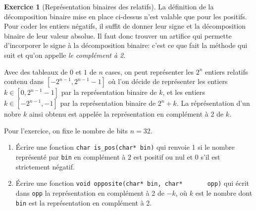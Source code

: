 \documentclass[french,a4paper]{article}
\theoremstyle{definition}
\newtheorem{exercise}{Exercice}
\theoremstyle{remark}
\newcommand{\inlinec}[1]{\lstinline[style=C]°#1°}
\begin{document}
\begin{exercise}[Représentation binaires des relatifs]
  La définition de la décomposition binaire mise en place ci-dessus
  n'est valable que pour les positifs. Pour coder les entiers
  négatifs, il suffit de donner leur signe et la décomposition binaire
  de leur valeur absolue. Il faut donc trouver un artifice qui
  permette d'incorporer le signe à la décomposition binaire: c'est ce
  que fait la méthode qui suit et qu'on appelle {\em le complément à
    2}.

  Avec des tableaux de $0$ et $1$ de $n$ cases, on peut représenter
  les $2^n$ entiers relatifs contenu dans $[-2^{n-1},2^{n-1}-1]$ où
  l'on décide de représenter les entiers $k \in [0,2^{n-1}-1]$ par la
  représentation binaire de $k$, et les entiers $k \in [-2^{n-1},-1]$
  par la représentation binaire de $2^n+k$. La réprésentation d'un
  nobre $k$ ainsi obtenu est appelée la représentation en complément à
  2 de $k$.

  Pour l'exercice, on fixe le nombre de bits $n=32$.
  \begin{enumerate}[label=(\arabic*)]
  \item \'Ecrire une fonction \inlinec{char is_pos(char* bin)} qui
    renvoie 1 si le nombre représenté par \inlinec{bin} en complément
    à 2 est positif ou nul et 0 s'il est strictement négatif.
  \item \'Ecrire une fonction \inlinec{void opposite(char* bin, char*
      opp)} qui écrit dans \inlinec{opp} la représentation en
    complément à 2 de $-k$, où $k$ est le nombre dont \inlinec{bin}
    est la représentation en complément à 2.
  \end{enumerate}
\end{exercise}
\end{document}
